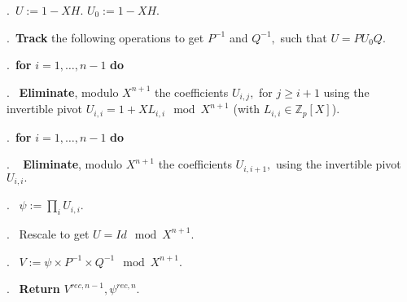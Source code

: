 \documentclass{sig-alternate-05-2015}
\newcommand{\Z}{\mathbb Z}
\newcommand{\Zp}{\Z_p}
\begin{document}
\smallskip

.\ $U:=1-XH.$ $U_0:=1-XH.$

.\ \textbf{Track} the following operations to get $P^{-1}$ and $Q^{-1},$
such that $U=PU_0Q.$


.\ {\bf for} $i=1,\dots,n-1$ {\bf do} 

.\  \:  \textbf{Eliminate}, modulo $X^{n+1}$ the coefficients $U_{i,j},$ for $j\geq i+1$ 
using the invertible pivot
$U_{i,i}=1+XL_{i,i} \mod X^{n+1}$ (with $L_{i,i} \in \Zp [X]$). 

.\    {\bf for} $i=1,\dots,n-1$ {\bf do} 

. \  \:  \textbf{Eliminate}, modulo $X^{n+1}$ the coefficients $U_{i,i+1},$
using the invertible pivot $U_{i,i}.$

. \ $\psi:=\prod_i U_{i,i}.$

. \ Rescale to get $U = Id \mod X^{n+1}.$

. \ $V:=\psi \times P^{-1} \times Q^{-1}   \mod X^{n+1}.$

. \ \textbf{Return} $V^{rec,n-1}, \psi^{rec,n}.$

\vspace{-1ex}\noindent\hrulefill

\medskip
\end{document}
